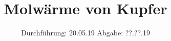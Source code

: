 

\subject{V47}
\title{Molwärme von Kupfer}
\date{
  Durchführung: 20.05.19
  \hspace{3em}
  Abgabe: ??.??.19
}



\maketitle
\thispagestyle{empty}
\tableofcontents
\newpage




%



\newpage
\printbibliography


